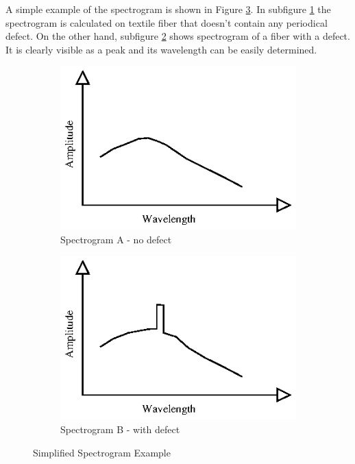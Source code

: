 \documentclass[twoside]{ctuthesis}
\theoremstyle{plain}
\theoremstyle{definition}
\theoremstyle{note}
\begin{document}
A simple example of the spectrogram is shown in Figure \ref{fig:specExpl}. In subfigure \ref{fig:specExpl_A} the spectrogram is calculated on textile fiber that doesn't contain any periodical defect. On the other hand, subfigure \ref{fig:specExpl_B} shows spectrogram of a fiber with a defect. It is clearly visible as a peak and its wavelength can be easily determined.
\begin{figure}
	\centering
	\begin{subfigure}{0.5\textwidth}
		\centering
		\includegraphics[width=1.0\linewidth]{spectrogram_good.eps}
		\caption{Spectrogram A - no defect}
		\label{fig:specExpl_A}
	\end{subfigure}%
	\begin{subfigure}{0.5\textwidth}
		\centering
		\includegraphics[width=1.0\linewidth]{spectrogram_bad.eps}
		\caption{Spectrogram B - with defect}
		\label{fig:specExpl_B}
	\end{subfigure}
	\caption{Simplified Spectrogram Example}
	\label{fig:specExpl}
\end{figure}
\end{document}
